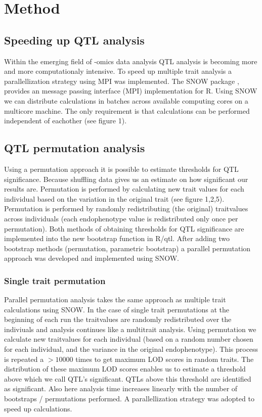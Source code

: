 \section{Method}
\subsection{Speeding up QTL analysis}
Within the emerging field of -omics data analysis QTL analysis is becoming more and more computationaly intensive. To speed up multiple trait analysis a parallellization strategy 
using MPI was implemented. The SNOW package \cite{tierney04}, provides an message passing interface (MPI) implementation for R. Using SNOW  
we can distribute calculations in batches across available computing cores on a multicore machine. The only requirement is that calculations
can be performed independent of eachother (see figure 1).
\subsection{QTL permutation analysis}
Using a permutation approach it is possible to estimate thresholds for QTL significance. Because shuffling data gives us an estimate on how significant our results are. Permutation is performed by calculating 
new trait values for each individual based on the variation in the original trait (see figure 1,2,5). Permutation is performed by 
randomly redistributing (the original) traitvalues across individuals (each endophenotype value is redistributed only once per permutation). 
Both methods of obtaining thresholds for QTL significance are implemented into the new bootstrap function in R/qtl. 
After adding two bootstrap methods (permutation, parametric bootstrap) a parallel permutation approach was developed and implemented using SNOW.
\subsubsection*{Single trait permutation}
Parallel permutation analysis takes the same approach as multiple trait calculations using SNOW. In the case 
of single trait permutations at the beginning of each run the traitvalues are randomly redistributed 
over the indiviuals and analysis continues like a multitrait analysis. Using permutation we calculate new traitvalues for each individual
(based on a random number chosen for each individual, and the variance in the original endophenotype). This process is repeated a $> 10000$ times
to get maximum LOD scores in random traits. The distribution of these maximum LOD scores enables us to estimate a threshold 
above which we call QTL's significant. QTLs above this threshold are identified as significant. Also here analysis time increases linearly with the number of bootstraps / permutations performed. A parallellization strategy was adopted to speed up calculations.
